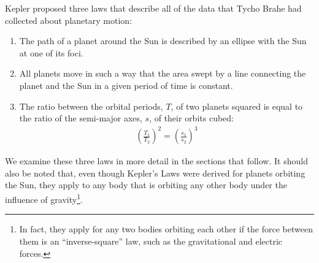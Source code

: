 Kepler proposed three laws that describe all of the data that Tycho Brahe had collected about planetary motion:
\begin{enumerate}
\item The path of a planet around the Sun is described by an ellipse with the Sun at one of its foci.
\item All planets move in such a way that the area swept by a line connecting the planet and the Sun in a given period of time is constant.
\item The ratio between the orbital periods, $T$, of two planets squared is equal to the ratio of the semi-major axes, $s$, of their orbits cubed:
\begin{align*}
\left(\frac{T_1}{T_2}\right)^2=\left(\frac{s_1}{s_2}\right)^3
\end{align*}
\end{enumerate}
We examine these three laws in more detail in the sections that follow. It should also be noted that, even though Kepler's Laws were derived for planets orbiting the Sun, they apply to any body that is orbiting any other body under the influence of gravity\footnote{In fact, they apply for any two bodies orbiting each other if the force between them is an ``inverse-square'' law, such as the gravitational and electric forces.}.

